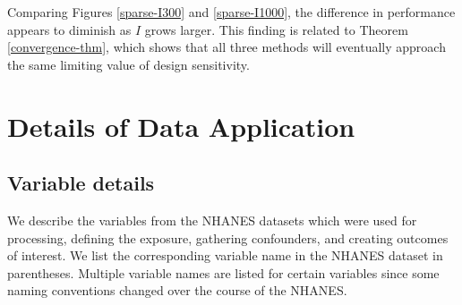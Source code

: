 \documentclass[12pt,leqno,titlepage]{amsart}
\newcommand{\1}{\mathbbm{1}}
\begin{document}
\begin{bibunit}
Comparing Figures \ref{sparse-I300} and \ref{sparse-I1000}, the difference in performance appears to diminish as $I$ grows larger. This finding is related to Theorem \ref{convergence-thm}, which shows that all three methods will eventually approach the same limiting value of design sensitivity.



\section{Details of Data Application} \label{appendix:data-app}




\subsection{Variable details}

We describe the variables from the NHANES datasets which were used for processing, defining the exposure, gathering confounders, and creating outcomes of interest. We list the corresponding variable name in the NHANES dataset in parentheses. Multiple variable names are listed for certain variables since some naming conventions changed over the course of the NHANES.\\


\end{bibunit}
\end{document}

